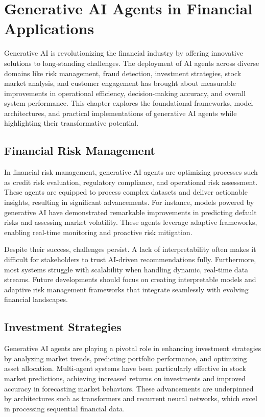 \documentclass[a4paper,headinclude=on,footinclude=on,12pt,oneside]{scrbook}
\begin{document}
\chapter{Generative AI Agents in Financial Applications}

Generative AI is revolutionizing the financial industry by offering innovative solutions to long-standing challenges. The deployment of AI agents across diverse domains like risk management, fraud detection, investment strategies, stock market analysis, and customer engagement has brought about measurable improvements in operational efficiency, decision-making accuracy, and overall system performance. This chapter explores the foundational frameworks, model architectures, and practical implementations of generative AI agents while highlighting their transformative potential.

\section{Financial Risk Management}

In financial risk management, generative AI agents are optimizing processes such as credit risk evaluation, regulatory compliance, and operational risk assessment. These agents are equipped to process complex datasets and deliver actionable insights, resulting in significant advancements. For instance, models powered by generative AI have demonstrated remarkable improvements in predicting default risks and assessing market volatility. These agents leverage adaptive frameworks, enabling real-time monitoring and proactive risk mitigation.

Despite their success, challenges persist. A lack of interpretability often makes it difficult for stakeholders to trust AI-driven recommendations fully. Furthermore, most systems struggle with scalability when handling dynamic, real-time data streams. Future developments should focus on creating interpretable models and adaptive risk management frameworks that integrate seamlessly with evolving financial landscapes.

\section{Investment Strategies}

Generative AI agents are playing a pivotal role in enhancing investment strategies by analyzing market trends, predicting portfolio performance, and optimizing asset allocation. Multi-agent systems have been particularly effective in stock market predictions, achieving increased returns on investments and improved accuracy in forecasting market behaviors. These advancements are underpinned by architectures such as transformers and recurrent neural networks, which excel in processing sequential financial data.
\end{document}
